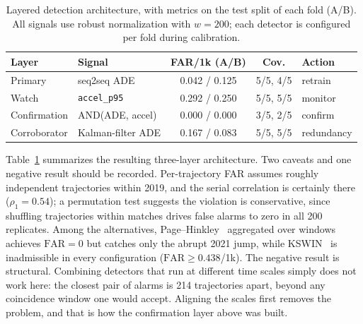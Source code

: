 \documentclass[conference]{IEEEtran}
\begin{document}
\begin{table}[!t]
\centering
\caption{Layered detection architecture, with metrics on the test split of
each fold (A/B). All signals use robust normalization with $w = 200$; each
detector is configured per fold during calibration.}
\label{tab:detection}
\footnotesize
\setlength{\tabcolsep}{3pt}
\begin{tabular}{@{}llccl@{}}
\toprule
\textbf{Layer} & \textbf{Signal} & \textbf{FAR/1k (A/B)} & \textbf{Cov.}
 & \textbf{Action} \\
\midrule
Primary      & seq2seq ADE          & 0.042 / 0.125 & 5/5, 4/5 & retrain \\
Watch        & \texttt{accel\_p95}  & 0.292 / 0.250 & 5/5, 5/5 & monitor \\
Confirmation & AND(ADE, accel)      & 0.000 / 0.000 & 3/5, 2/5 & confirm \\
\midrule
Corroborator & Kalman-filter ADE  & 0.167 / 0.083 & 5/5, 5/5 & redundancy \\
\bottomrule
\end{tabular}
\end{table}

Table~\ref{tab:detection} summarizes the resulting three-layer architecture.
Two caveats and one negative result should be recorded. Per-trajectory FAR
assumes roughly independent trajectories within 2019, and the serial
correlation is certainly there ($\rho_1 = 0.54$); a permutation test suggests
the violation is conservative, since shuffling trajectories within matches
drives false alarms to zero in all 200 replicates. Among the alternatives,
Page--Hinkley~\cite{page_hinkley} aggregated over windows achieves
$\mathrm{FAR} = 0$ but catches only the abrupt 2021 jump, while
KSWIN~\cite{kswin} is inadmissible in every configuration
($\mathrm{FAR} \geq 0.438$/1k). The negative result is structural. Combining
detectors that run at different time scales simply does not work here: the
closest pair of alarms is 214 trajectories apart, beyond any coincidence window
one would accept. Aligning the scales first removes the problem, and that is
how the confirmation layer above was built.

\end{document}
